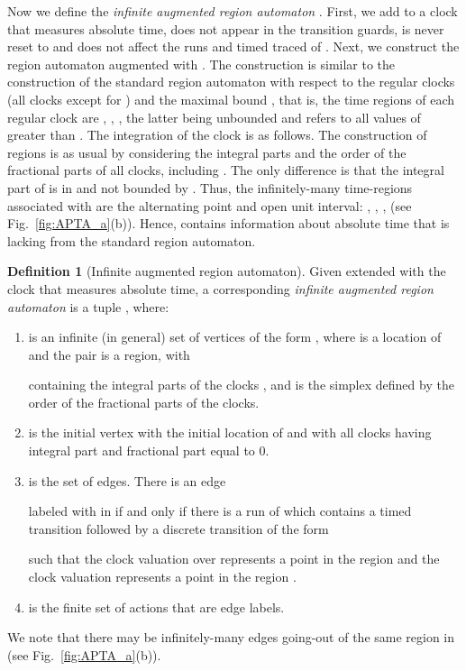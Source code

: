 \documentclass[11pt]{amsart}
\theoremstyle{definition}
\newtheorem{definition}[theorem]{Definition}
\begin{document}
Now we define the \emph{infinite augmented region automaton} .
First, we add to  a clock  that measures absolute time, does not appear in the transition guards, is never reset to  and does not affect the runs and timed traced of .
Next, we construct the region automaton augmented with .
The construction is similar to the construction of the standard region automaton with respect to the regular clocks (all clocks except for ) and the maximal bound , that is, the time regions of each regular clock  are , , , the latter being unbounded and refers to all values of  greater than .
The integration of the clock  is as follows. The construction of regions is as usual by considering the integral parts and the order of the fractional parts of all clocks, including . The only difference is that the integral part of  is in  and not bounded by . Thus, the infinitely-many time-regions associated with  are the alternating point and open unit interval: , , ,  (see Fig.~\ref{fig:APTA_a}(b)).
Hence,   contains information about absolute time that is lacking from the standard region automaton.
\begin{definition}[Infinite augmented region automaton]
	\label{def:inf_aug_region_automaton}
	Given  extended with the clock  that measures absolute time, a corresponding \emph{infinite augmented region automaton}  is a tuple , where:
	\begin{enumerate}
		\item  is an infinite (in general) set of vertices of the form , where  is a location of  and the pair  is a region, with
		
		containing the integral parts of the clocks , and 
		is the simplex defined by the order of the fractional parts of the clocks.
		\item  is the initial vertex with  the initial location of  and with all clocks having integral part and fractional part equal to 0.
		\item  is the set of edges.
		There is an edge
		
		labeled with  in  if and only if there is a run of   which contains a timed transition followed by a discrete transition of the form
		
		such that the clock valuation  over  represents a point in the region  and the clock valuation  represents a point in the region .
		\item  is the finite set of actions that are edge labels.
	\end{enumerate}
\end{definition}
We note that there may be infinitely-many edges going-out of the same region in  (see Fig.~\ref{fig:APTA_a}(b)).
\end{document}

